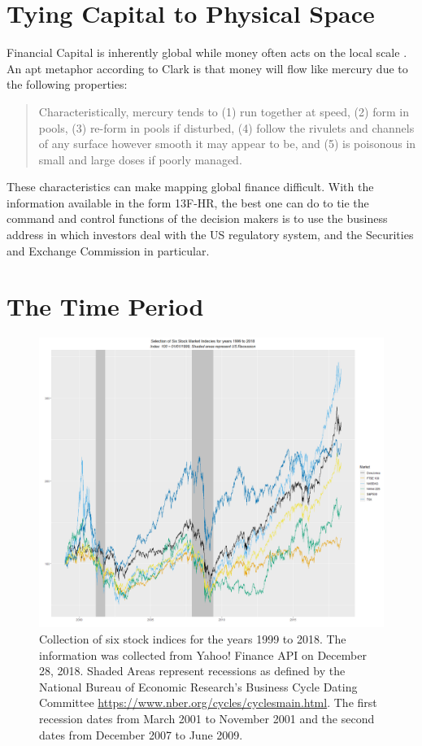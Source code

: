 \section{Tying Capital to Physical Space}

Financial Capital is inherently global while money often acts on the local scale \citep{clarkmoney2005}.  An apt metaphor according to Clark is that money will flow like mercury due to the following properties: 


\begin{quote}Characteristically, mercury tends to (1) run together at speed, (2) form in pools, (3) re-form in pools if disturbed, (4) follow the rivulets and channels of any surface however smooth it may appear to be, and (5) is poisonous in small and large doses if poorly managed. \citep[p105]{clarkmoney2005}
\end{quote}

These characteristics can make mapping global finance difficult. With the information available in the form 13F-HR, the best one can do to tie the command and control functions of the decision makers is to use the business address in which investors deal with the US regulatory system, and the Securities and Exchange Commission in particular. 


\section{The Time Period}
\begin{figure}[H]
	\centering
	\includegraphics[width=1\textwidth]{Figures/ChapterII/Stock_Market}
	\caption[Stock Indices for 1999 to May 2018]{Collection of six stock indices for the years 1999 to 2018. The information was collected from Yahoo! Finance API on December 28, 2018.  Shaded Areas represent recessions as defined by the National Bureau of Economic Research's Business Cycle Dating Committee \url{https://www.nber.org/cycles/cyclesmain.html}.  The first recession dates from March 2001 to November 2001 and the second dates from December 2007 to June 2009. }
	\label{fig:stockmarket}
\end{figure}

